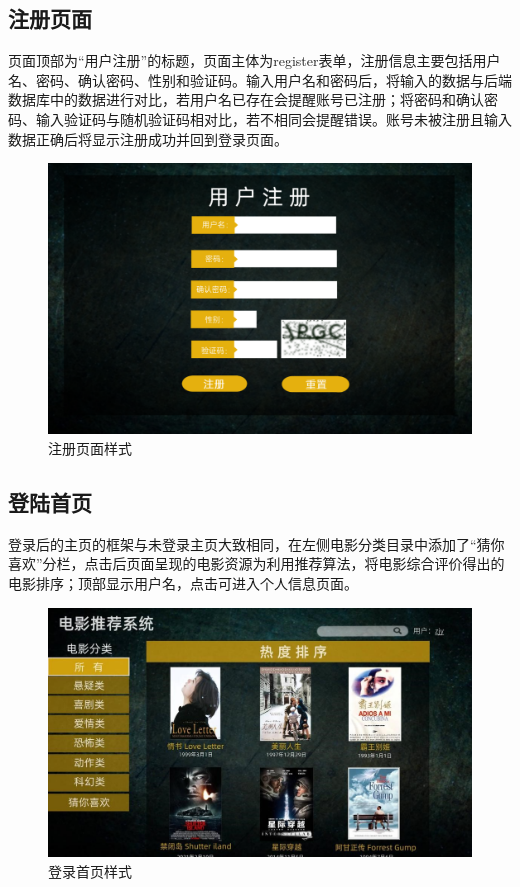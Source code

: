 \documentclass{ctexart}
\begin{document}
\subsection{注册页面}
页面顶部为“用户注册”的标题，页面主体为register表单，注册信息主要包括用户名、密码、确认密码、性别和验证码。输入用户名和密码后，将输入的数据与后端数据库中的数据进行对比，若用户名已存在会提醒账号已注册；将密码和确认密码、输入验证码与随机验证码相对比，若不相同会提醒错误。账号未被注册且输入数据正确后将显示注册成功并回到登录页面。
\begin {figure}[h]
\centering %
\includegraphics[width=\textwidth]{p3.png}
\caption{注册页面样式} %
\label{five}
\end {figure}

\subsection{登陆首页}
登录后的主页的框架与未登录主页大致相同，在左侧电影分类目录中添加了“猜你喜欢”分栏，点击后页面呈现的电影资源为利用推荐算法，将电影综合评价得出的电影排序；顶部显示用户名，点击可进入个人信息页面。
\begin {figure}[h]
\centering %
\includegraphics[width=\textwidth]{p4.jpg}
\caption{登录首页样式} %

\label{five}
\end {figure}
\end{document}
